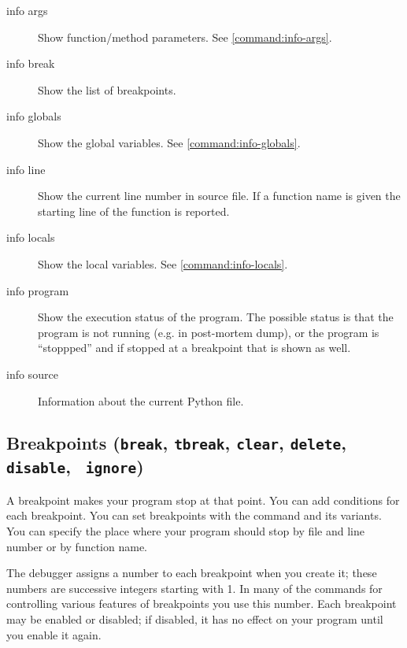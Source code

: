 \begin{description}

\item[info args]

Show function/method parameters. See \ref{command:info-args}.

\item[info break]

Show the list of breakpoints. 

\item[info globals]

Show the global variables. See \ref{command:info-globals}. 

\item[info line]

Show the current line number in source file. If a function name is
given the starting line of the function is reported.

\item[info locals]

Show the local variables. See \ref{command:info-locals}. 

\item[info program]

Show the execution status of the program. The possible status is that
the program is not running (e.g. in post-mortem dump), or the program is
``stoppped'' and if stopped at a breakpoint that is shown as well.

\item[info source]

Information about the current Python file.

\end{description}

\subsection{Breakpoints ({\tt break}, {\tt tbreak}, {\tt clear},
  {\tt delete}, {\tt disable}, {\tt
  ignore})\label{subsubsection-brkpts}}

 A breakpoint makes your program stop at that
point. You can add conditions for each breakpoint.  You can set
breakpoints with the  command and its variants. You can specify
the place where your program should stop by file and line number or by
function name.

The debugger assigns a number to each breakpoint when you create it;
these numbers are successive integers starting with 1.  In many of the
commands for controlling various features of breakpoints you use this
number.  Each breakpoint may be enabled or disabled; if disabled, it
has no effect on your program until you enable it again.

